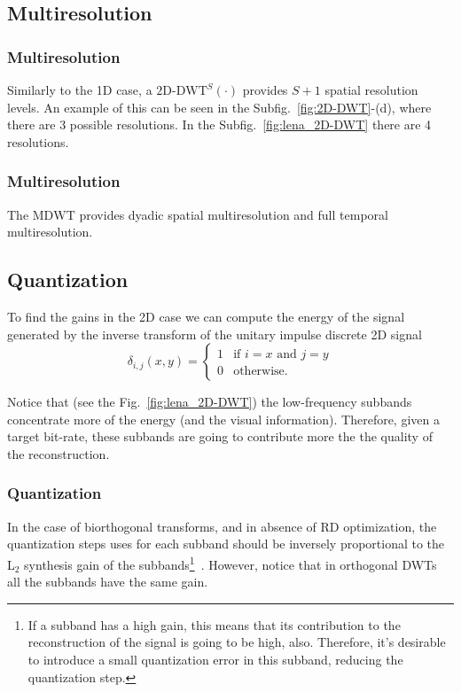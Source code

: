 \subsection{Multiresolution}

\subsubsection{Multiresolution}
Similarly to the 1D case, a $\text{2D-DWT}^S(\cdot)$ provides $S+1$
spatial resolution levels. An example of this can be seen in the
Subfig.~\ref{fig:2D-DWT}-(d), where there are 3 possible
resolutions. In the Subfig.~\ref{fig:lena_2D-DWT} there are 4
resolutions.

\subsubsection{Multiresolution}
The $\text{MDWT}$ provides dyadic spatial multiresolution and full
temporal multiresolution.

\subsection{Quantization}
To find the gains in the 2D case we can compute the energy of the
signal generated by the inverse transform of the unitary impulse
discrete 2D signal
\begin{equation}
  \delta_{i,j}(x,y) = 
  \left\{
  \begin{array}{ll}
    1 & \text{if $i=x$ and $j=y$}\\
    0 & \text{otherwise}.
  \end{array}
  \right.
\end{equation}

Notice that (see the Fig.~\ref{fig:lena_2D-DWT}) the low-frequency
subbands concentrate more of the energy (and the visual
information). Therefore, given a target bit-rate, these subbands are going to contribute more the the quality of the reconstruction.

\subsubsection{Quantization}
In the case of biorthogonal transforms, and in absence of RD optimization, the quantization steps uses for each subband should be inversely
proportional to the L$_2$ synthesis gain of the subbands\footnote{If a
  subband has a high gain, this means that its contribution to the
  reconstruction of the signal is going to be high, also. Therefore,
  it's desirable to introduce a small quantization error in this
  subband, reducing the quantization
  step.}~\cite{marcellin2002overview}. However, notice that in orthogonal DWTs all the subbands have the same gain.

